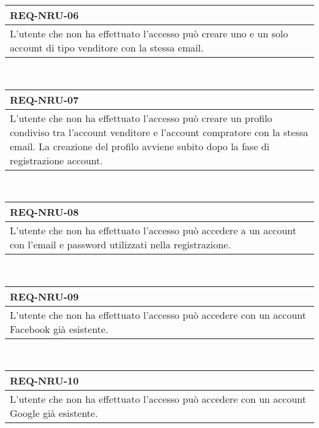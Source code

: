                 \begin{tabular}{|p{}|}
                    \hline
                    \multicolumn{1}{|l|}{\cellcolor{head}\textbf{REQ-NRU-06}} \\
                    \hline
                    L'utente che non ha effettuato l'accesso può creare uno e un solo account di tipo venditore con la stessa email. \\
                    \hline
                \end{tabular} \smallskip \\
                \begin{tabular}{|p{}|}
                    \hline
                    \multicolumn{1}{|l|}{\cellcolor{head}\textbf{REQ-NRU-07}} \\
                    \hline
                    L'utente che non ha effettuato l'accesso può creare un profilo condiviso tra l'account venditore e l'account compratore con la stessa email. La creazione del profilo avviene subito dopo la fase di registrazione account. \\
                    \hline
                \end{tabular} \smallskip \\
                \begin{tabular}{|p{}|}
                    \hline
                    \multicolumn{1}{|l|}{\cellcolor{head}\textbf{REQ-NRU-08}} \\
                    \hline
                    L'utente che non ha effettuato l'accesso può accedere a un account con l'email e password utilizzati nella registrazione. \\
                    \hline
                \end{tabular} \smallskip \\
                \begin{tabular}{|p{}|}
                    \hline
                    \multicolumn{1}{|l|}{\cellcolor{head}\textbf{REQ-NRU-09}} \\
                    \hline
                    L'utente che non ha effettuato l'accesso può accedere con un account Facebook già esistente. \\
                    \hline
                \end{tabular} \smallskip \\
                \begin{tabular}{|p{}|}
                    \hline
                    \multicolumn{1}{|l|}{\cellcolor{head}\textbf{REQ-NRU-10}} \\
                    \hline
                    L'utente che non ha effettuato l'accesso può accedere con un account Google già esistente. \\
                    \hline
                \end{tabular} \smallskip \\
                
